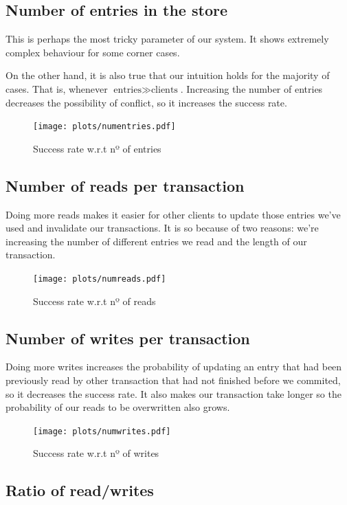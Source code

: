 \documentclass[a4paper, 10pt]{article}
\begin{document}
\clearpage
\subsection{Number of entries in the store}
\label{sec:numentries}
This is perhaps the most tricky parameter of our system. It shows extremely complex behaviour for some corner cases.

On the other hand, it is also true that our intuition holds for the majority of cases. That is, whenever $\text{entries} \gg \text{clients}$. Increasing the number of entries decreases the possibility of conflict, so it increases the success rate.
\begin{figure}[H]
  \centering
  \texttt{[image: plots/numentries.pdf]}
    \caption{Success rate w.r.t nº of entries}
    \label{fig:numentries}
\end{figure} 

\clearpage
\subsection{Number of reads per transaction}
\label{sec:numreads}
Doing more reads makes it easier for other clients to update those entries we've used and invalidate our transactions. It is so because of two reasons: we're increasing the number of different entries we read and the length of our transaction.

\begin{figure}[H]
  \centering
  \texttt{[image: plots/numreads.pdf]}
    \caption{Success rate w.r.t nº of reads}
    \label{fig:numreads}
\end{figure} 

\clearpage
\subsection{Number of writes per transaction}
\label{sec:numwrites}
Doing more writes increases the probability of updating an entry that had been previously read by other transaction that had not finished before we commited, so it decreases the success rate. It also makes our transaction take longer so the probability of our reads to be overwritten also grows.

\begin{figure}[H]
  \centering
  \texttt{[image: plots/numwrites.pdf]}
    \caption{Success rate w.r.t nº of writes}
    \label{fig:numwrites}
\end{figure} 


\clearpage
\subsection{Ratio of read/writes}
\label{sec:ratioreadwrites}
\end{document}
